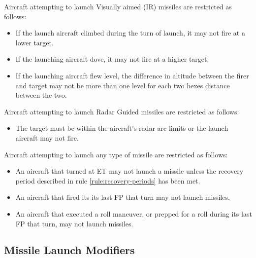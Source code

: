 Aircraft attempting to launch Visually aimed (IR) missiles are restricted as follows:

\begin{itemize}

    \item If the launch aircraft climbed during the turn of launch, it may not fire at a lower target.

    \item If the launching aircraft dove, it may not fire at a higher target.

    \item If the launching aircraft flew level, the difference in altitude between the firer and target may not be more than one level for each two hexes distance between the two.

\end{itemize}

Aircraft attempting to launch Radar Guided missiles are restricted as follows:

\begin{itemize}

    \item The target must be within the aircraft's radar arc limits or the launch aircraft may not fire.

\end{itemize}

Aircraft attempting to launch any type of missile are restricted as follows:

\begin{itemize}

    \item An aircraft that turned at ET may not launch a missile unless the recovery period described in rule \ref{rule:recovery-periods} has been met.

    \item An aircraft that fired its  its last FP that turn may not launch missiles.

    \item An aircraft that executed a roll maneuver, or prepped for a roll during its last FP that turn, may not launch missiles.

\end{itemize}

\subsection{Missile Launch Modifiers}
\label{rule:missile-launch-modifiers}

